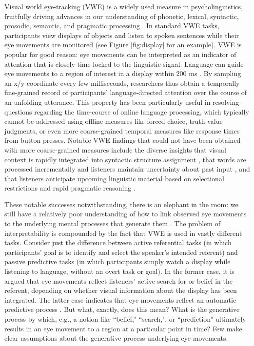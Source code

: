 \documentclass[10pt,letterpaper]{article}
\newcommand{\figref}[1]{Figure \ref{#1}}
\begin{document}
Visual world eye-tracking (VWE) is a widely used measure in psycholinguistics, fruitfully driving advances in our understanding of phonetic, lexical, syntactic, prosodic, semantic, and pragmatic processing  \cite{tanenhaus1995,Allopenna1998,altmann1999,clayards2008,SedivyEtAl1999:Achieving-Incremental-Semantic-,huang2009,kurumada2014}. %
In standard VWE tasks, participants view displays of objects and listen to spoken sentences while their eye movements are monitored (see \figref{fig:display} for an example). VWE is popular for good reason: eye movements can be interpreted as an indicator of attention that is closely time-locked to the linguistic signal. Language can guide eye movements to a region of interest in a display within 200 ms \cite{Allopenna1998}. By sampling an x/y coordinate every few milliseconds, researchers thus obtain a temporally fine-grained record of participants' language-directed attention over the course of an unfolding utterance. This property has been particularly useful in resolving questions regarding the time-course of online language processing, which typically cannot be addressed using offline measures like forced choice, truth-value judgments, or even more coarse-grained temporal measures like response times from button presses. Notable VWE findings that could not have been obtained with more coarse-grained measures include the diverse insights that visual context is rapidly integrated into syntactic structure assignment \cite{tanenhaus1995}, %
that words are processed incrementally and listeners maintain uncertainty about past input \cite{Allopenna1998,clayards2008}, and that listeners anticipate upcoming linguistic material based on selectional restrictions and rapid pragmatic reasoning \cite{altmann1999,SedivyEtAl1999:Achieving-Incremental-Semantic-}.

These notable successes notwithstanding, there is an elephant in the room: we still have a relatively poor understanding of how to link observed eye movements to the underlying mental processes that generate them \cite{SalverdaTanenhaus2017:The-Visual-World-Paradigm, tanenhaus2000eye, Allopenna1998, magnuson2019fixations}. The problem of interpretability  is compounded by the fact that VWE is used in vastly different tasks. Consider just the difference between active referential tasks (in which participants' goal is to identify and select the speaker's intended referent) and passive predictive tasks (in which participants simply watch a display while listening to language, without an overt task or goal). In the former case, it is argued that eye movements reflect listeners' active search for or belief in the referent, depending on whether visual information about the display has been integrated. The latter case indicates that eye movements reflect an automatic predictive process \cite{altmann1999}. But what, exactly, does this mean? What is the generative process by which, e.g., a notion like ``belief," ``search,", or ``prediction" ultimately results in an eye movement to a region at a particular point in time? Few make clear assumptions about the generative process underlying eye movements.
\end{document}
